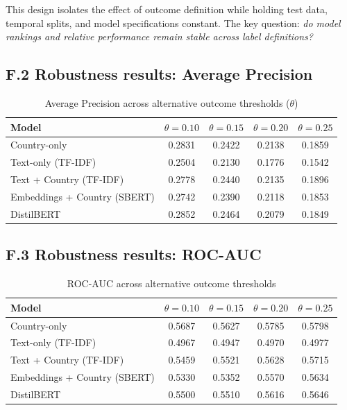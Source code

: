 \documentclass[11pt,a4paper]{article}
\begin{document}
This design isolates the effect of outcome definition while holding test data, temporal splits, and model specifications constant. The key question: \textit{do model rankings and relative performance remain stable across label definitions?}

\subsection*{F.2 Robustness results: Average Precision}
\begin{table}[H]
\centering
\caption{Average Precision across alternative outcome thresholds ($\theta$)}
\label{tab:ap-theta}
\begin{tabular}{lcccc}
\toprule
Model & $\theta=0.10$ & $\theta=0.15$ & $\theta=0.20$ & $\theta=0.25$ \\
\midrule
Country-only & 0.2831 & 0.2422 & 0.2138 & 0.1859 \\
Text-only (TF-IDF) & 0.2504 & 0.2130 & 0.1776 & 0.1542 \\
Text + Country (TF-IDF) & 0.2778 & 0.2440 & 0.2135 & 0.1896 \\
Embeddings + Country (SBERT) & 0.2742 & 0.2390 & 0.2118 & 0.1853 \\
DistilBERT & 0.2852 & 0.2464 & 0.2079 & 0.1849 \\
\bottomrule
\end{tabular}
\end{table}

\subsection*{F.3 Robustness results: ROC-AUC}
\begin{table}[H]
\centering
\caption{ROC-AUC across alternative outcome thresholds}
\label{tab:auc-theta}
\begin{tabular}{lcccc}
\toprule
Model & $\theta=0.10$ & $\theta=0.15$ & $\theta=0.20$ & $\theta=0.25$ \\
\midrule
Country-only & 0.5687 & 0.5627 & 0.5785 & 0.5798 \\
Text-only (TF-IDF) & 0.4967 & 0.4947 & 0.4970 & 0.4977 \\
Text + Country (TF-IDF) & 0.5459 & 0.5521 & 0.5628 & 0.5715 \\
Embeddings + Country (SBERT) & 0.5330 & 0.5352 & 0.5570 & 0.5634 \\
DistilBERT & 0.5500 & 0.5510 & 0.5616 & 0.5646 \\
\bottomrule
\end{tabular}
\end{table}
\end{document}

